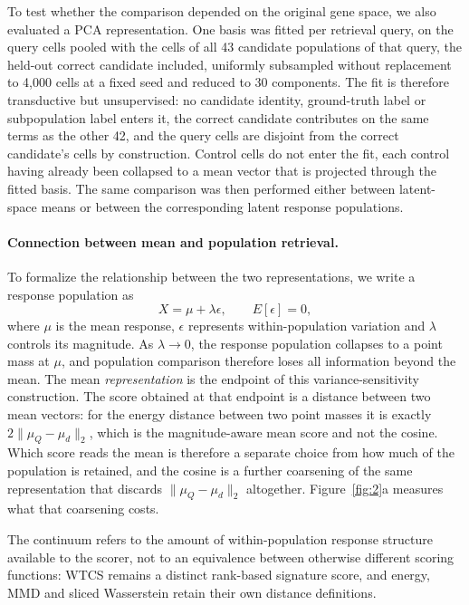 \documentclass[11pt,letterpaper]{article}
\begin{document}
To test whether the comparison depended on the original gene space, we also evaluated
a PCA representation. One basis was fitted per retrieval query, on the query cells pooled with
the cells of all 43 candidate populations of that query, the held-out correct candidate included,
uniformly subsampled without replacement to 4,000 cells at a fixed seed and reduced to 30
components. The fit is therefore transductive but unsupervised: no candidate identity, ground-truth
label or subpopulation label enters it, the correct candidate contributes on the same terms as the
other 42, and the query cells are disjoint from the correct candidate's cells by construction.
Control cells do not enter the fit, each control having already been collapsed to a mean vector
that is projected through the fitted basis. The same comparison was then performed either between
latent-space means or between the corresponding latent response populations.

\paragraph{Connection between mean and population retrieval.}
To formalize the relationship between the two representations, we write a response
population as
\[
X=\mu+\lambda\epsilon,
\qquad
E[\epsilon]=0,
\]
where $\mu$ is the mean response, $\epsilon$ represents within-population variation and
$\lambda$ controls its magnitude. As $\lambda\rightarrow0$, the response population
collapses to a point mass at $\mu$, and population comparison therefore loses all
information beyond the mean. The mean \emph{representation} is the endpoint of this
variance-sensitivity construction. The score obtained at that endpoint is a distance
between two mean vectors: for the energy distance between two point masses it is
exactly $2\lVert\mu_Q-\mu_d\rVert_2$, which is the magnitude-aware mean score and not
the cosine. Which score reads the mean is therefore a separate choice from how much of
the population is retained, and the cosine is a further coarsening of the same
representation that discards $\lVert\mu_Q-\mu_d\rVert_2$ altogether. Figure~\ref{fig:2}a
measures what that coarsening costs.

The continuum refers to the amount of within-population response structure available to the
scorer, not to an equivalence between otherwise different scoring functions: WTCS remains a
distinct rank-based signature score, and energy, MMD and sliced Wasserstein retain their own
distance definitions.
\end{document}
